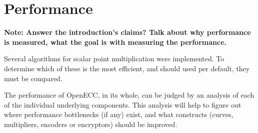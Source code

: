 \section{Performance}
\label{sec:performance}

 \textbf{Note: Answer the introduction's claims? Talk about why performance is measured, what the goal is with measuring the
 performance.}
 
 Several algorithms for scalar point multiplication were implemented. To determine which of these is the most efficient,
 and should used per default, they must be compared.
 
 The performance of OpenECC, in its whole, can be judged by an analysis of each of the
 individual underlying components. This analysis will help to figure out where performance bottlenecks (if
 any) exist, and what constructs (curves, multipliers, encoders or encryptors) should be improved.



